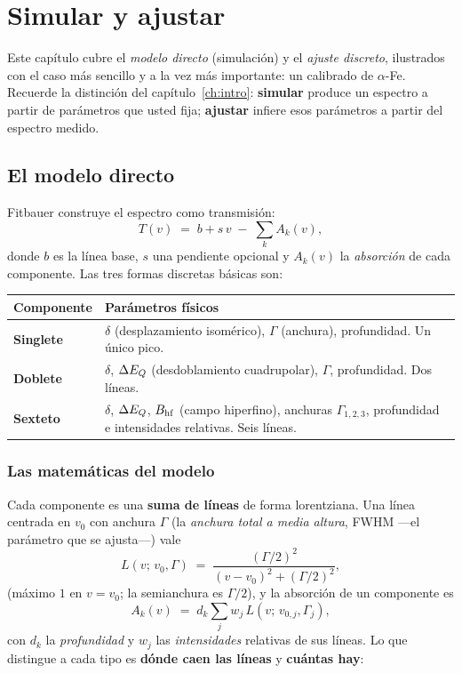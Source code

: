 \chapter{Simular y ajustar}
\label{ch:simular}

Este capítulo cubre el \emph{modelo directo} (simulación) y el \emph{ajuste
discreto}, ilustrados con el caso más sencillo y a la vez más importante: un
calibrado de $\alpha$-Fe. Recuerde la distinción del
capítulo~\ref{ch:intro}: \textbf{simular} produce un espectro a partir de
parámetros que usted fija; \textbf{ajustar} infiere esos parámetros a partir del
espectro medido.

\section{El modelo directo}

Fitbauer construye el espectro como transmisión:
\[
  T(v) \;=\; b + s\,v \;-\; \sum_{k} A_k(v),
\]
donde $b$ es la línea base, $s$ una pendiente opcional y $A_k(v)$ la
\emph{absorción} de cada componente. Las tres formas discretas básicas son:

\begin{center}
\begin{tabular}{@{}lp{}@{}}
\toprule
\textbf{Componente} & \textbf{Parámetros físicos} \\
\midrule
\textbf{Singlete} & $\delta$ (desplazamiento isomérico), $\Gamma$ (anchura),
profundidad. Un único pico. \\[3pt]
\textbf{Doblete} & $\delta$, $\Delta E_{Q}$ (desdoblamiento cuadrupolar), $\Gamma$,
profundidad. Dos líneas. \\[3pt]
\textbf{Sexteto} & $\delta$, $\Delta E_{Q}$, $B_{\mathrm{hf}}$ (campo hiperfino), anchuras
$\Gamma_{1,2,3}$, profundidad e intensidades relativas. Seis líneas. \\
\bottomrule
\end{tabular}
\end{center}


\subsection{Las matemáticas del modelo}
\label{sec:modelo-mates}

Cada componente es una \textbf{suma de líneas} de forma lorentziana. Una línea
centrada en $v_0$ con anchura $\Gamma$ (la \emph{anchura total a media altura},
FWHM —el parámetro que se ajusta—) vale
\[
  L(v;\,v_0,\Gamma) \;=\; \frac{(\Gamma/2)^2}{(v-v_0)^2 + (\Gamma/2)^2},
\]
(máximo $1$ en $v=v_0$; la semianchura es $\Gamma/2$), y la absorción de un
componente es
\[
  A_k(v) \;=\; d_k \sum_{j} w_j \, L(v;\,v_{0,j},\Gamma_j),
\]
con $d_k$ la \emph{profundidad} y $w_j$ las \emph{intensidades} relativas de sus
líneas. Lo que distingue a cada tipo es \textbf{dónde caen las líneas} y
\textbf{cuántas hay}:

